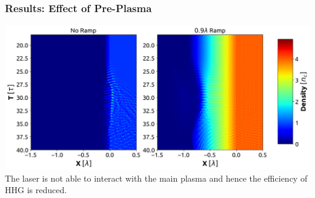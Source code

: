 \documentclass{beamer}
\begin{document}
\begin{frame}
    \frametitle{Results: Effect of  Pre-Plasma}
    \centering
    \includegraphics[width=1\textwidth]{images/ramp_d.png}
    \scriptsize{The laser is not able to interact with the main plasma and hence the efficiency of HHG is reduced.}
    \label{fig:ramp-density}
\end{frame}
\end{document}
